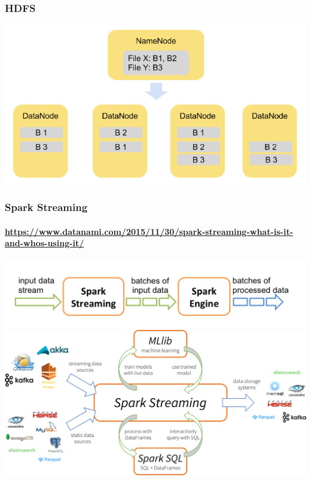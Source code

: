 \documentclass[14pt]{beamer}
\begin{document}
\begin{frame}[allowframebreaks]
  \frametitle{HDFS}
  \includegraphics[width=\textwidth]{img/hdfs1}
\end{frame}

\begin{frame}
  \frametitle{Spark Streaming}
  \framesubtitle{\url{https://www.datanami.com/2015/11/30/spark-streaming-what-is-it-and-whos-using-it/}}
  \includegraphics[width=\textwidth]{img/streaming-flow}\\
\vspace*{-.5em}
  \includegraphics[width=\textwidth]{img/spark-streaming-datanami}
\end{frame}
\end{document}
